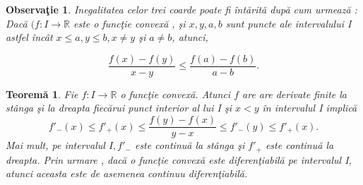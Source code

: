 \documentclass[a4paper,12pt,oneside]{report}
\newtheorem{theorem}{Teorem\u a}
\newtheorem{remark}{Observa\c{t}ie}
\begin{document}
\begin{remark}
Inegalitatea celor trei coarde poate fi \^{i}nt\u{a}rit\u{a} dup\u{a} cum urmeaz\u{a} : Dac\u{a} \((f : I \rightarrow \mathbb{R}\) este o func\c{t}ie convex\u{a} , \c{s}i \(x,y,a,b\) sunt puncte ale intervalului I astfel \^{i}nc\^{a}t \(x \leq a, y\leq b, x \neq y\) \c{s}i \(a \neq b\), atunci,
\end{remark}
\begin{displaymath}
   \frac{f\left ( x \right )- f\left ( y \right )}{x-y}\leq \frac{f\left ( a \right )- f\left ( b \right )}{a-b}. 
\end{displaymath}
\begin{theorem} \label{Teorema 7} 
Fie \(f : I \rightarrow \mathbb{R}\) o func\c{t}ie convex\u{a}. Atunci \(f\) are are derivate finite la st\^{a}nga \c{s}i la dreapta fiec\u{a}rui punct interior al lui I \c{s}i \(x <y\) \^{i}n intervalul I implic\u{a}
\begin{displaymath}
   {f}'_{-}\left ( x \right )\leq {f}'_{+}\left ( x \right )\leq \frac{f\left ( y \right )-f\left ( x \right )}{y-x}\leq {f}'_{-}\left ( y \right )\leq {f}'_{+}\left ( x \right ).
\end{displaymath}
Mai mult, pe intervalul \(I, {f}'_{-}\) este continu\u{a} la st\^{a}nga \c{s}i \({f}'_{+}\) este continu\u{a} la dreapta. 
	Prin urmare , dac\u{a} o func\c{t}ie convex\u{a} este diferen\c{t}iabil\u{a} pe intervalul I, atunci aceasta este de asemenea continuu diferen\c{t}iabil\u{a}. 
\end{theorem}
\end{document}
